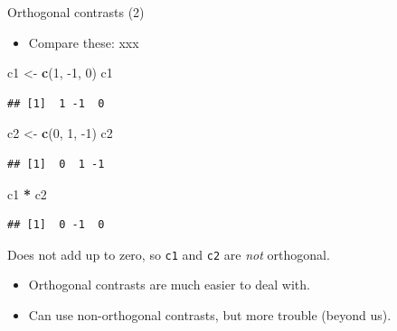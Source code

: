 \documentclass[ignorenonframetext,]{beamer}
\newenvironment{Shaded}{\begin{snugshade}}{\end{snugshade}}
\newcommand{\DecValTok}[1]{\textcolor[rgb]{0.00,0.00,0.81}{#1}}
\newcommand{\KeywordTok}[1]{\textcolor[rgb]{0.13,0.29,0.53}{\textbf{#1}}}
\newcommand{\NormalTok}[1]{#1}
\newcommand{\OperatorTok}[1]{\textcolor[rgb]{0.81,0.36,0.00}{\textbf{#1}}}
\newcommand{\StringTok}[1]{\textcolor[rgb]{0.31,0.60,0.02}{#1}}
\providecommand{\tightlist}{%
  \setlength{\itemsep}{0pt}\setlength{\parskip}{0pt}}
\begin{document}
\begin{frame}[fragile]{Orthogonal contrasts (2)}
\protect\hypertarget{orthogonal-contrasts-2}{}

\begin{itemize}
\tightlist
\item
  Compare these: xxx
\end{itemize}

\small

\begin{Shaded}
\begin{Highlighting}[]
\NormalTok{c1 <-}\StringTok{ }\KeywordTok{c}\NormalTok{(}\DecValTok{1}\NormalTok{, }\DecValTok{-1}\NormalTok{, }\DecValTok{0}\NormalTok{)}
\NormalTok{c1}
\end{Highlighting}
\end{Shaded}

\begin{verbatim}
## [1]  1 -1  0
\end{verbatim}

\begin{Shaded}
\begin{Highlighting}[]
\NormalTok{c2 <-}\StringTok{ }\KeywordTok{c}\NormalTok{(}\DecValTok{0}\NormalTok{, }\DecValTok{1}\NormalTok{, }\DecValTok{-1}\NormalTok{)}
\NormalTok{c2}
\end{Highlighting}
\end{Shaded}

\begin{verbatim}
## [1]  0  1 -1
\end{verbatim}

\begin{Shaded}
\begin{Highlighting}[]
\NormalTok{c1 }\OperatorTok{*}\StringTok{ }\NormalTok{c2}
\end{Highlighting}
\end{Shaded}

\begin{verbatim}
## [1]  0 -1  0
\end{verbatim}

\normalsize

Does not add up to zero, so \texttt{c1} and \texttt{c2} are \emph{not}
orthogonal.

\begin{itemize}
\item
  Orthogonal contrasts are much easier to deal with.
\item
  Can use non-orthogonal contrasts, but more trouble (beyond us).
\end{itemize}

\end{frame}
\end{document}
